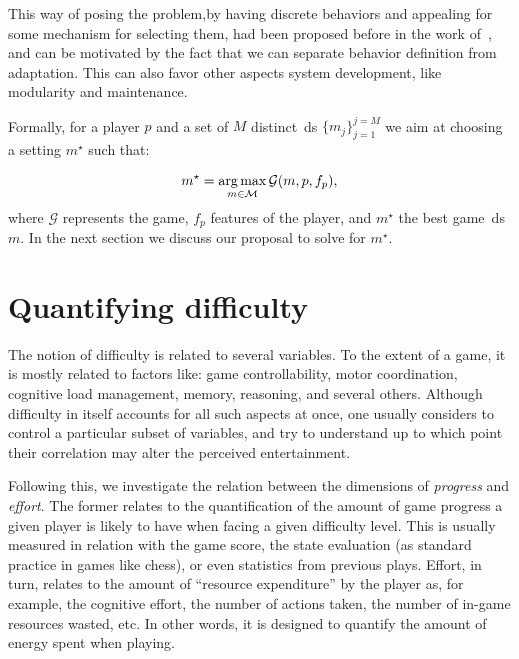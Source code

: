 This way of posing the problem,\ie by having discrete behaviors and appealing for some mechanism for selecting them, had been proposed before in the work of~\cite{sejrsgaard-jacobsen_dynamic_2011}, and can be motivated by the fact that we can separate behavior definition from adaptation. This can also favor other aspects system development, like modularity and maintenance.

Formally, for a player $p$ and a set of $M$ distinct~\gls{ds} $\{m_{j}\}^{j=M}_{j=1}$ we aim at choosing a setting $m^{\star}$ such that:

\begin{equation}
m^{\star} = \operatorname*{arg\,max}_{m \in \mathcal{M}} \mathcal{G}(m, p, f_{p}),
\end{equation}
where $\mathcal{G}$ represents the game, $f_{p}$ features of the player, and $m^{\star}$ the best game~\gls{ds} $m$. %
In the next section we discuss our proposal to solve for $m^{\star}$.

\section{Quantifying difficulty}\label{sec:quant_difficulty}
The notion of difficulty is related to several variables. To the extent of a game, it is mostly related to factors like: game controllability, motor coordination, cognitive load management, memory, reasoning, and several others. Although difficulty in itself accounts for all such aspects at once, one usually considers to control a particular subset of variables, and try to understand up to which point their correlation may alter the perceived entertainment.

Following this, we investigate the relation between the dimensions of \textit{progress} and \textit{effort}. The former relates to the quantification of the amount of game progress a given player is likely to have when facing a given difficulty level. %
This is usually measured in relation with the game score, the state evaluation (as standard practice in games like chess), or even statistics from previous plays. Effort, in turn, relates to the amount of ``resource expenditure'' by the player as, for example, the cognitive effort, the number of actions taken, the number of in-game resources wasted, etc. In other words, it is designed to quantify the amount of energy spent when playing.

